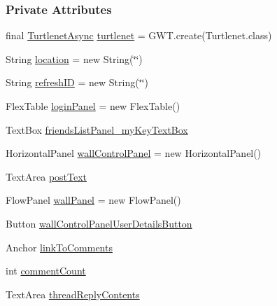 \subsubsection*{Private Attributes}
\begin{DoxyCompactItemize}
\item 
final \hyperlink{interfaceballmerpeak_1_1turtlenet_1_1client_1_1TurtlenetAsync}{Turtlenet\-Async} \hyperlink{classballmerpeak_1_1turtlenet_1_1client_1_1frontend_aef6ce8b50c96dc1af6177f057c4b717f}{turtlenet} = G\-W\-T.\-create(Turtlenet.\-class)
\item 
String \hyperlink{classballmerpeak_1_1turtlenet_1_1client_1_1frontend_a7d6f7af35b97248a4c87681b56b247b6}{location} = new String(\char`\"{}\char`\"{})
\item 
String \hyperlink{classballmerpeak_1_1turtlenet_1_1client_1_1frontend_a280a54ef9864d0adbd9a44e32b7a4775}{refresh\-I\-D} = new String(\char`\"{}\char`\"{})
\item 
Flex\-Table \hyperlink{classballmerpeak_1_1turtlenet_1_1client_1_1frontend_a8991d2d9a0c72e08986aa710d0e02278}{login\-Panel} = new Flex\-Table()
\item 
Text\-Box \hyperlink{classballmerpeak_1_1turtlenet_1_1client_1_1frontend_a342dab1f72f4cf1660ec756f4180b331}{friends\-List\-Panel\-\_\-my\-Key\-Text\-Box}
\item 
Horizontal\-Panel \hyperlink{classballmerpeak_1_1turtlenet_1_1client_1_1frontend_a7ec1c30337c5278194425a4fa458996b}{wall\-Control\-Panel} = new Horizontal\-Panel()
\item 
Text\-Area \hyperlink{classballmerpeak_1_1turtlenet_1_1client_1_1frontend_af105d0e6450c2caedeaee033e8f5d444}{post\-Text}
\item 
Flow\-Panel \hyperlink{classballmerpeak_1_1turtlenet_1_1client_1_1frontend_aabfe3b109c5a81d51ede885f008d7530}{wall\-Panel} = new Flow\-Panel()
\item 
Button \hyperlink{classballmerpeak_1_1turtlenet_1_1client_1_1frontend_ae8e9ee35fb5626cbcdffeb1217d9b71e}{wall\-Control\-Panel\-User\-Details\-Button}
\item 
Anchor \hyperlink{classballmerpeak_1_1turtlenet_1_1client_1_1frontend_a1dc4e0c879ec185e39c9df33f96b99d6}{link\-To\-Comments}
\item 
int \hyperlink{classballmerpeak_1_1turtlenet_1_1client_1_1frontend_acabb927a2716d2523f33d8055a608a7c}{comment\-Count}
\item 
Text\-Area \hyperlink{classballmerpeak_1_1turtlenet_1_1client_1_1frontend_a0135fa512db0b8a94e65353bad182e11}{thread\-Reply\-Contents}

\end{DoxyCompactItemize}
